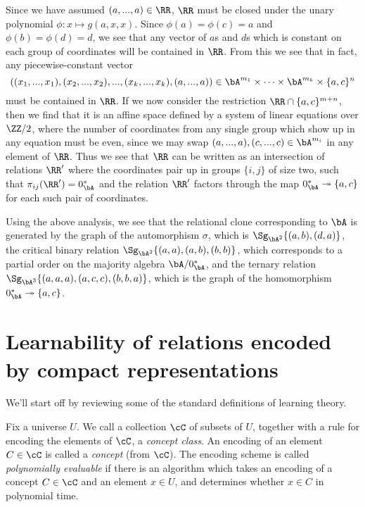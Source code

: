 \begin{ex}
Since we have assumed $(a,...,a) \in \RR$, $\RR$ must be closed under the unary polynomial $\phi : x \mapsto g(a,x,x)$. Since $\phi(a) = \phi(c) = a$ and $\phi(b) = \phi(d) = d$, we see that any vector of $a$s and $d$s which is constant on each group of coordinates will be contained in $\RR$. From this we see that in fact, any piecewise-constant vector
\[
((x_1,...,x_1),(x_2,...,x_2), ..., (x_k, ..., x_k), (a,...,a)) \in \bA^{m_1} \times \cdots \times \bA^{m_k} \times \{a,c\}^n
\]
must be contained in $\RR$. If we now consider the restriction $\RR \cap \{a,c\}^{m+n}$, then we find that it is an affine space defined by a system of linear equations over $\ZZ/2$, where the number of coordinates from any single group which show up in any equation must be even, since we may swap $(a,...,a),(c,...,c) \in \bA^{m_i}$ in any element of $\RR$. Thus we see that $\RR$ can be written as an intersection of relations $\RR'$ where the coordinates pair up in groups $\{i,j\}$ of size two, such that $\pi_{ij}(\RR') = 0^*_\bA$ and the relation $\RR'$ factors through the map $0^*_\bA \twoheadrightarrow \{a,c\}$ for each such pair of coordinates.

Using the above analysis, we see that the relational clone corresponding to $\bA$ is generated by the graph of the automorphism $\sigma$, which is $\Sg_{\bA^2}\{(a,b),(d,a)\}$, the critical binary relation $\Sg_{\bA^2}\{(a,a),(a,b),(b,b)\}$, which corresponds to a partial order on the majority algebra $\bA/0^*_\bA$, and the ternary relation $\Sg_{\bA^3}\{(a,a,a),(a,c,c),(b,b,a)\}$, which is the graph of the homomorphism $0^*_\bA \twoheadrightarrow \{a,c\}$.
\end{ex}


\section{Learnability of relations encoded by compact representations}%

We'll start off by reviewing some of the standard definitions of learning theory.

\begin{defn} Fix a universe $U$. We call a collection $\cC$ of subsets of $U$, together with a rule for encoding the elements of $\cC$, a \emph{concept class}. An encoding of an element $C \in \cC$ is called a \emph{concept} (from $\cC$). The encoding scheme is called \emph{polynomially evaluable} if there is an algorithm which takes an encoding of a concept $C \in \cC$ and an element $x \in U$, and determines whether $x \in C$ in polynomial time.
\end{defn}

